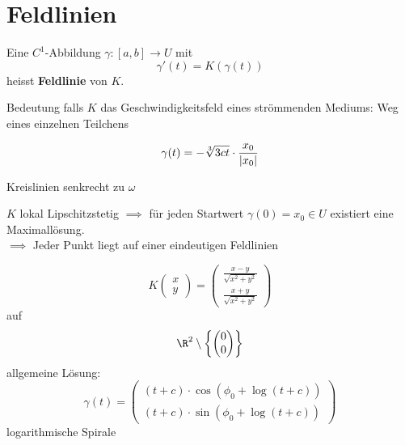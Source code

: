 \section{Feldlinien}
\begin{def*}[note = Feldlinie , index = Feldlinie]
	Eine $C^1$-Abbildung $\gamma : [a,b] \rightarrow U$ mit
	\[ \gamma'(t) = K(\gamma(t)) \]
	heisst \textbf{Feldlinie} von $K$.
	
	Bedeutung falls $K$ das Geschwindigkeitsfeld eines strömmenden Mediums: Weg eines einzelnen Teilchens
\end{def*}
\begin{bsp*}[note = 2]
	\[ \gamma(t) = -\sqrt[3]{3ct} \cdot \frac{x_0}{\abs{x_0}} \]
\end{bsp*}
\begin{bsp*}[note = {3,4}]
	Kreislinien senkrecht zu $\omega$
\end{bsp*}
\begin{bem}
	$K$ lokal Lipschitzstetig $\implies$ für jeden Startwert $\gamma(0) = x_0 \in U$ existiert eine Maximallösung. \\
	$\implies$ Jeder Punkt liegt auf einer eindeutigen Feldlinien
\end{bem}
\begin{bsp}
	\[ K\begin{pmatrix} x \\ y \end{pmatrix} = \begin{pmatrix} \frac{x-y}{\sqrt{x^2 + y^2}} \\ \frac{x+y}{\sqrt{x^2 + y^2}} \end{pmatrix} \]
	auf
	\[ \R^2 \setminus \left\{ \begin{pmatrix} 0 \\ 0 \end{pmatrix} \right\} \]
	allgemeine Lösung:
	\[ \gamma(t) = \begin{pmatrix} (t+c) \cdot \cos( \phi_0 + \log(t+c)) \\ (t+c) \cdot \sin( \phi_0 + \log(t+c)) \end{pmatrix} \]
	logarithmische Spirale
\end{bsp}

